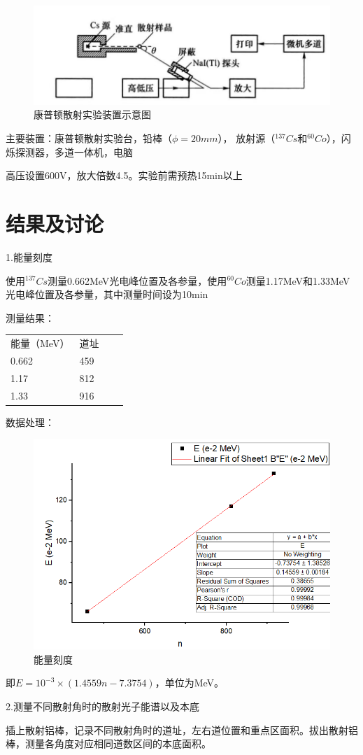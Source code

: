 \documentclass[font=default]{mpltx}
\begin{document}
\begin{figure}
  \centering
  \includegraphics[width=0.85\linewidth]{fig/instrument2.jpg}
  \caption{康普顿散射实验装置示意图}
  \label{sec:instrument2}
\end{figure}

主要装置：康普顿散射实验台，铅棒（$\phi = 20 mm$），
放射源（$ ^{137}{Cs}$和$ ^{60}{Co}$），闪烁探测器，多道一体机，电脑

高压设置600V，放大倍数4.5。实验前需预热15min以上

\section{结果及讨论}
1.能量刻度

使用$ ^{137}{Cs}$测量0.662MeV光电峰位置及各参量，使用$ ^{60}{Co}$测量1.17MeV和1.33MeV光电峰位置及各参量，其中测量时间设为10min

测量结果：

\begin{table}[]
\begin{tabular}{llll}
能量（MeV）                & 道址                  \\
0.662                     & 459                    \\
1.17                      & 812                    \\
1.33                      & 916                     \\
\end{tabular}
\end{table}

数据处理： 

\begin{figure}
  \centering
  \includegraphics[width=0.85\linewidth]{fig/data2(1).png}
  \caption{能量刻度}
  \label{sec:data2(1)}
\end{figure}

即$E = {10}^{-3} \times (1.4559n - 7.3754)$，单位为MeV。

2.测量不同散射角时的散射光子能谱以及本底

插上散射铝棒，记录不同散射角时的道址，左右道位置和重点区面积。拔出散射铝棒，测量各角度对应相同道数区间的本底面积。
\end{document}
